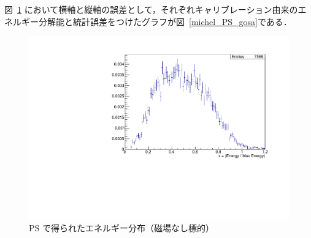 図~\ref{michel_PS} において横軸と縦軸の誤差として，それぞれキャリブレーション由来のエネルギー分解能と統計誤差をつけたグラフが図~\ref{michel_PS_gosa}である．
\begin{figure}[H]
\centering
\begin{minipage}{0.4\columnwidth}
\centering
\includegraphics[height=\columnwidth,angle=-90]{figure/ikemitsu/michel_PS.pdf}
\caption{PS で得られたエネルギー分布（磁場なし標的）}
\label{michel_PS}    
\end{minipage} 
\begin{minipage}{0.4\columnwidth}
\centering

\end{minipage}
\end{figure}
